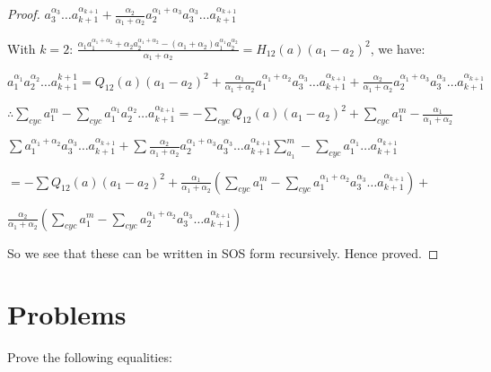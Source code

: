 \begin{proof}
  $a_3^{\alpha_3}\ldots a_{k + 1}^{\alpha_{k + 1}} + \frac{\alpha_2}{\alpha_1 + \alpha_2}a_2^{\alpha_1 + \alpha_3}a_3^{\alpha_3}\ldots a_{k
    + 1}^{\alpha_{k +1}}$

  With $k = 2$: $\frac{\alpha_1a_1^{\alpha_1 + \alpha_2} + \alpha_2a_2^{\alpha_1 + \alpha_2} - (\alpha_1 +
    \alpha_2)a_1^{\alpha_1}a_2^{\alpha_2}}{\alpha_1 + \alpha_2} = H_{12}(a)(a_1 - a_2)^2$, we have:

  $a_1^{\alpha_1}a_2^{\alpha_2}\ldots a_{k+1}^{k + 1} = Q_{12}(a)(a_1 - a_2)^2 + \frac{\alpha_1}{\alpha_1 +
    \alpha_2}a_1^{\alpha_1+\alpha_2}a_3^{\alpha_3}\ldots a_{k + 1}^{\alpha_{k + 1}} + \frac{\alpha_2}{\alpha_1 + \alpha_2}a_2^{\alpha_1 +
    \alpha_3}a_3^{\alpha_3}\ldots a_{k + 1}^{\alpha_{k +1}}$

  $\therefore \sum_{cyc}a_1^m - \sum_{cyc}a_1^{\alpha_1}a_2^{\alpha_2}\ldots a_{k + 1}^{\alpha_{k + 1}} = -\sum_{cyc}Q_{12}(a)(a_1
  - a_2)^2 + \sum_{cyc}a_1^m - \frac{\alpha_1}{\alpha_1 +
    \alpha_2}$

  $\sum a_1^{\alpha_1+\alpha_2} a_3^{\alpha_3}\ldots a_{k + 1}^{\alpha_{k + 1}} + \sum\frac{\alpha_2}{\alpha_1 +
    \alpha_2}a_2^{\alpha_1 +\alpha_3}a_3^{\alpha_3}\ldots a_{k + 1}^{\alpha_{k +1}} \sum_{a_1}^m - \sum_{cyc}a_1^{\alpha_1}\ldots
  a_{k +1}^{\alpha_{k +1}}$

  $= -\sum Q_{12}(a)(a_1 - a_2)^2 + \frac{\alpha_1}{\alpha_1 + \alpha_2}\left(\sum_{cyc} a_1^m - \sum_{cyc}a_1^{\alpha_1 +
    \alpha_2}a_3^{\alpha_3}\ldots a_{k+1}^{\alpha_{k+1}}\right) + $

  $\frac{\alpha_2}{\alpha_1 + \alpha_2}\left(\sum_{cyc} a_1^m - \sum_{cyc}a_2^{\alpha_1 + \alpha_2}a_3^{\alpha_3}\ldots a_{k+1}^{\alpha_{k+1}}\right)$

  So we see that these can be written in SOS form recursively. Hence proved.
\end{proof}

\section{Problems}
Prove the following equalities:

